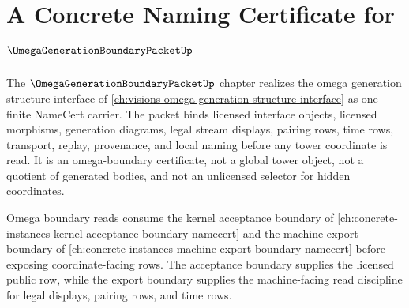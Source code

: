 \chapter{A Concrete Naming Certificate for $\OmegaGenerationBoundaryPacketUp$}
\label{ch:concrete-instances-omega-generation-boundary-packet-namecert}

The $\OmegaGenerationBoundaryPacketUp$ chapter realizes the omega generation structure interface of \autoref{ch:visions-omega-generation-structure-interface} as one finite NameCert carrier. The packet binds licensed interface objects, licensed morphisms, generation diagrams, legal stream displays, pairing rows, time rows, transport, replay, provenance, and local naming before any tower coordinate is read. It is an omega-boundary certificate, not a global tower object, not a quotient of generated bodies, and not an unlicensed selector for hidden coordinates.

Omega boundary reads consume the kernel acceptance boundary of \autoref{ch:concrete-instances-kernel-acceptance-boundary-namecert} and the machine export boundary of \autoref{ch:concrete-instances-machine-export-boundary-namecert} before exposing coordinate-facing rows. The acceptance boundary supplies the licensed public row, while the export boundary supplies the machine-facing read discipline for legal displays, pairing rows, and time rows.

